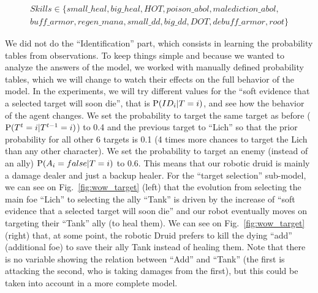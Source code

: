 \begin{eqnarray*}
Skills \in \{ small\_heal, big\_heal, HOT, poison\_abol, malediction\_abol,\\
            buff\_armor, regen\_mana, small\_dd, big\_dd, DOT, debuff\_armor, root \}
\end{eqnarray*}

We did not do the ``Identification'' part, which consists in learning the probability tables from observations. To keep things simple and because we wanted to analyze the answers of the model, we worked with manually defined probability tables, %
which we will change to watch their effects on the full behavior of the model. 
In the experiments, we will try different values for the ``soft evidence that a selected target will soon die'', that is $\mathrm{P}(ID_i | T=i)$, and see how the behavior of the agent changes. 
We set the probability to target the same target as before ($\mathrm{P}(T^t=i|T^{t-1}=i)$) to 0.4 and the previous target to ``Lich'' so that the prior probability for all other 6 targets is 0.1 (4 times more chances to target the Lich than any other character). 
We set the probability to target an enemy (instead of an ally) $\mathrm{P}(A_i=false|T=i)$ to 0.6. This means that our robotic druid is mainly a damage dealer and just a backup healer. For the ``target selection'' sub-model, we can see on Fig.~\ref{fig:wow_target} (left) that the evolution from selecting the main foe ``Lich'' to selecting the ally ``Tank'' is driven by the increase of 
``soft evidence that a selected target will soon die'' and our robot eventually moves on targeting their ``Tank'' ally (to heal them). We can see on Fig.~\ref{fig:wow_target} (right) that, at some point, the robotic Druid prefers to kill the dying ``add'' (additional foe) to save their ally Tank instead of healing them. Note that there is no variable showing the relation between ``Add'' and ``Tank'' (the first is attacking the second, who is taking damages from the first), but this could be taken into account in a more complete model.


